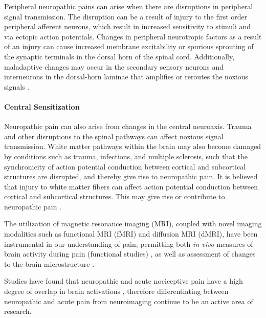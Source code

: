 Peripheral neuropathic pains can arise when there are disruptions in peripheral signal transmission. The disruption can be a result of injury to the first order peripheral afferent neurons, which result in increased sensitivity to stimuli and via ectopic action potentials. Changes in peripheral neurotropic factors as a result of an injury can cause increased membrane excitability or spurious sprouting of the synaptic terminals in the dorsal horn of the spinal cord. Additionally, maladaptive changes may occur in the secondary sensory neurons and interneurons in the dorsal-horn laminae that amplifies or reroutes the noxious signals \cite{Elmes2004}.

\paragraph{Central Sensitization}

Neuropathic pain can also arise from changes in the central neuroaxis. Trauma and other disruptions to the spinal pathways can affect noxious signal transmission. White matter pathways within the brain may also become damaged by conditions such as trauma, infections, and multiple sclerosis, such that the synchronicity of action potential conduction between cortical and subcortical structures are disrupted, and thereby give rise to neuropathic pain. It is believed that injury to white matter fibers can affect action potential conduction between cortical and subcortical structures. This may give rise or contribute to neuropathic pain \cite{Geha2008}.

 The utilization of magnetic resonance imaging (MRI), coupled with novel imaging modalities such as functional MRI (fMRI) and diffusion MRI (dMRI), have been instrumental in our understanding of pain, permitting both \textit{in vivo} measures of brain activity during pain (functional studies) \cite{Davis2006}, as well as assessment of changes to the brain microstructure \cite{Hodaie2009a,Chen2015c}.
 
 Studies have found that neuropathic and acute nociceptive pain have a high degree of overlap in brain activations \cite{Moisset2007}, therefore differentiating between neuropathic and acute pain from neuroimaging continue to be an active area of research. 
 
